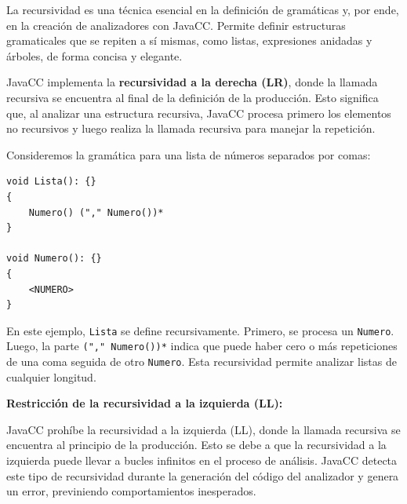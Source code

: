 \noindent La recursividad es una técnica esencial en la definición de gramáticas y, por ende, en la creación de analizadores con JavaCC. Permite definir estructuras gramaticales que se repiten a sí mismas, como listas, expresiones anidadas y árboles, de forma concisa y elegante.

JavaCC implementa la \textbf{recursividad a la derecha (LR)}, donde la llamada recursiva se encuentra al final de la definición de la producción. Esto significa que, al analizar una estructura recursiva, JavaCC procesa primero los elementos no recursivos y luego realiza la llamada recursiva para manejar la repetición.

Consideremos la gramática para una lista de números separados por comas:


\lstset{inputencoding=utf8/latin1}
\begin{lstlisting}
void Lista(): {}
{
	Numero() ("," Numero())*
}

void Numero(): {}
{
	<NUMERO>
}
\end{lstlisting}

En este ejemplo, \lstinline|Lista| se define recursivamente. Primero, se procesa un \lstinline|Numero|. Luego, la parte \lstinline|("," Numero())*| indica que puede haber cero o más repeticiones de una coma seguida de otro \lstinline|Numero|. Esta recursividad permite analizar listas de cualquier longitud.

\phantom{text}

\noindent \textbf{Restricción de la recursividad a la izquierda (LL):}

\phantom{text}

JavaCC prohíbe la recursividad a la izquierda (LL), donde la llamada recursiva se encuentra al principio de la producción. Esto se debe a que la recursividad a la izquierda puede llevar a bucles infinitos en el proceso de análisis. JavaCC detecta este tipo de recursividad durante la generación del código del analizador y genera un error, previniendo comportamientos inesperados.



